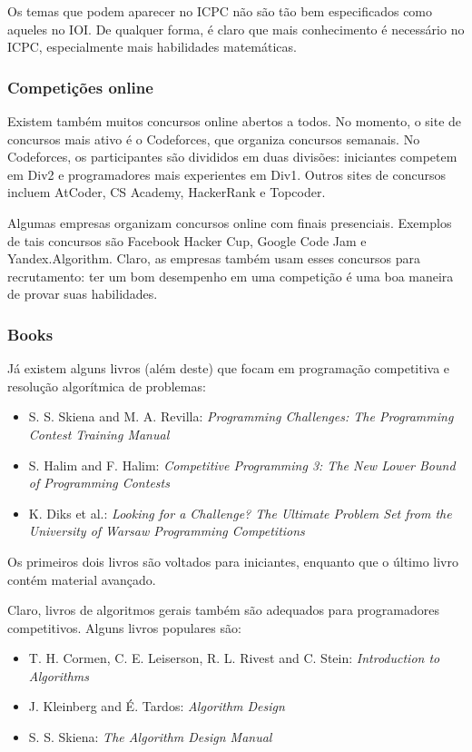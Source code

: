 Os temas que podem aparecer no ICPC não são tão bem especificados como aqueles no IOI.
De qualquer forma, é claro que mais conhecimento é necessário
no ICPC, especialmente mais habilidades matemáticas.

\subsubsection{Competições online}

Existem também muitos concursos online abertos a todos.
No momento, o site de concursos mais ativo é o Codeforces,
que organiza concursos semanais.
No Codeforces, os participantes são divididos em duas divisões:
iniciantes competem em Div2 e programadores mais experientes em Div1.
Outros sites de concursos incluem AtCoder, CS Academy, HackerRank e Topcoder.

Algumas empresas organizam concursos online com finais presenciais.
Exemplos de tais concursos são Facebook Hacker Cup,
Google Code Jam e Yandex.Algorithm.
Claro, as empresas também usam esses concursos para recrutamento:
ter um bom desempenho em uma competição é uma boa maneira de provar suas habilidades.

\subsubsection{Books}

Já existem alguns livros (além deste) que focam em programação competitiva
e resolução algorítmica de problemas:

\begin{itemize}
\item S. S. Skiena and M. A. Revilla:
\emph{Programming Challenges: The Programming Contest Training Manual} \cite{ski03}
\item S. Halim and F. Halim:
\emph{Competitive Programming 3: The New Lower Bound of Programming Contests} \cite{hal13}
\item K. Diks et al.: \emph{Looking for a Challenge? The Ultimate Problem Set from
the University of Warsaw Programming Competitions} \cite{dik12}
\end{itemize}

Os primeiros dois livros são voltados para iniciantes, enquanto que o último
livro contém material avançado.

Claro, livros de algoritmos gerais também são adequados para
programadores competitivos.
Alguns livros populares são:

\begin{itemize}
\item T. H. Cormen, C. E. Leiserson, R. L. Rivest and C. Stein:
\emph{Introduction to Algorithms} \cite{cor09}
\item J. Kleinberg and É. Tardos:
\emph{Algorithm Design} \cite{kle05}
\item S. S. Skiena:
\emph{The Algorithm Design Manual} \cite{ski08}
\end{itemize}
